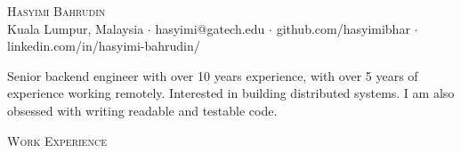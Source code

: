 \documentclass[a4paper]{article}
\newcommand{\lineunder} {
    \vspace*{-8pt} \\
    \hspace*{-18pt} \hrulefill \\
}
\newcommand{\header} [1] {
    {\hspace*{-18pt}\vspace*{6pt} \textsc{#1}}
    \vspace*{-6pt} \lineunder
}
\begin{document}
\vspace*{-40pt}

    

\vspace*{-10pt}
\begin{center}
	{\Huge \scshape {Hasyimi Bahrudin}}
	\\
	Kuala Lumpur, Malaysia $\cdot$
	hasyimi@gatech.edu $\cdot$
	github.com/hasyimibhar $\cdot$
	linkedin.com/in/hasyimi-bahrudin/
	\\
\end{center}


\begin{center}
	Senior backend engineer with over 10 years experience, with over 5 years of experience working remotely. Interested in building distributed systems. I am also obsessed with writing readable and testable code.
\end{center}

\header{Work Experience}
\vspace{1mm}
\end{document}
